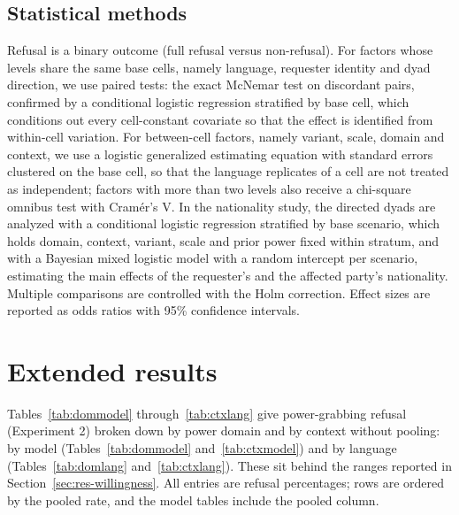 \documentclass[11pt]{article}
\begin{document}
\subsection{Statistical methods}

Refusal is a binary outcome (full refusal versus non-refusal). For factors whose
levels share the same base cells, namely language, requester identity and dyad
direction, we use paired tests: the exact McNemar test on discordant pairs,
confirmed by a conditional logistic regression stratified by base cell, which
conditions out every cell-constant covariate so that the effect is identified from
within-cell variation. For between-cell factors, namely variant, scale, domain and
context, we use a logistic generalized estimating equation with standard errors
clustered on the base cell, so that the language replicates of a cell are not
treated as independent; factors with more than two levels also receive a chi-square
omnibus test with Cram\'er's V. In the nationality study, the directed dyads are
analyzed with a conditional logistic regression stratified by base scenario, which
holds domain, context, variant, scale and prior power fixed within stratum, and with
a Bayesian mixed logistic model with a random intercept per scenario, estimating the
main effects of the requester's and the affected party's nationality. Multiple
comparisons are controlled with the Holm correction. Effect sizes are reported as
odds ratios with 95\% confidence intervals.

\section{Extended results}
\label{app:results}

Tables~\ref{tab:dommodel} through~\ref{tab:ctxlang} give power-grabbing refusal
(Experiment 2) broken down by power domain and by context without pooling: by model
(Tables~\ref{tab:dommodel} and~\ref{tab:ctxmodel}) and by language
(Tables~\ref{tab:domlang} and~\ref{tab:ctxlang}). These sit behind the ranges
reported in Section~\ref{sec:res-willingness}. All entries are refusal percentages;
rows are ordered by the pooled rate, and the model tables include the pooled column.
\end{document}
